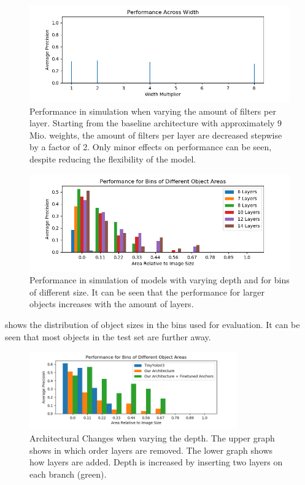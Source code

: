 \begin{figure}[hbtp]
	\centering
	\includegraphics[width=\textwidth]{fig/perf_width}
	\caption{Performance in simulation when varying the amount of filters per layer. Starting from the baseline architecture with approximately 9 Mio. weights, the amount of filters per layer are decreased stepwise by a factor of 2. Only minor effects on performance can be seen, despite reducing the flexibility of the model.}
	\label{fig:perf_width}
\end{figure}

\begin{figure}[hbtp]
	\centering
	\includegraphics[width=\textwidth]{fig/depth_ap_size}
	\caption{Performance in simulation of models with varying depth and for bins of different size. It can be seen that the performance for larger objects increases with the amount of layers.}
	\label{fig:depth_ap_size}
\end{figure}

 shows the distribution of object sizes in the bins used for evaluation. It can be seen that most objects in the test set are further away. 

\begin{figure}[hbtp]
	\centering
	\includegraphics[width=0.8\textwidth]{fig/hyperparam_size}
	\caption{Architectural Changes when varying the depth. The upper graph shows in which order layers are removed. The lower graph shows how layers are added. Depth is increased by inserting two layers on each branch (green). }
	\label{fig:hyp}
\end{figure}

